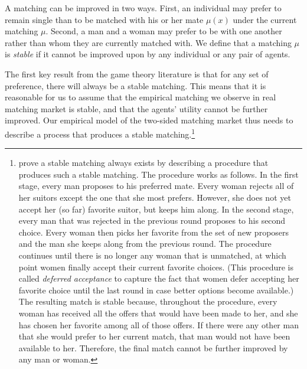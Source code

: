 A matching can be improved in two ways. First, an individual may prefer to
remain single than to be matched with his or her mate $\mu(x)$ under the current
matching $\mu$. Second, a man and a woman may prefer
to be with one another rather than whom they are currently matched with.
We define
that a matching $\mu$ is \textit{stable} if it cannot be improved upon by any individual
or any pair of agents.  

The first key result from the game theory literature is that
for any set of preference, there will always be a stable matching. This means
that it is reasonable for us to assume that the empirical matching we observe in
real matching market is stable, and that the agents' utility cannot be further
improved. Our empirical model of the two-sided matching market thus needs to
describe a process that produces a stable matching.\footnote{\citet{Gale1962}
  prove a stable matching always exists by describing a procedure that produces
  such a stable matching. The procedure works as follows. In the first stage, every man proposes to his preferred mate. Every
  woman rejects all of her suitors except the one that she most prefers.
  However, she does not yet accept her (so far) favorite suitor, but keeps him along. In the
  second stage, every man that was rejected in the previous round proposes to his second choice. Every
  woman then picks her favorite from the set of new proposers and the man she
  keeps along from the previous round. The procedure continues until there is no longer any
woman that is unmatched, at which point women finally accept their current
favorite choices. (This procedure is called \textit{deferred acceptance} to
capture the fact that women defer accepting her favorite choice until
the last round in case better options become available.) The resulting match is stable because, throughout the procedure, every woman has received all
the offers that would have been made to her, and she has chosen her favorite
among all of those offers. If there were any other man that she would prefer to
her current match, that man would not have been available to her. Therefore, the
final match cannot be further improved by any man or woman.}

